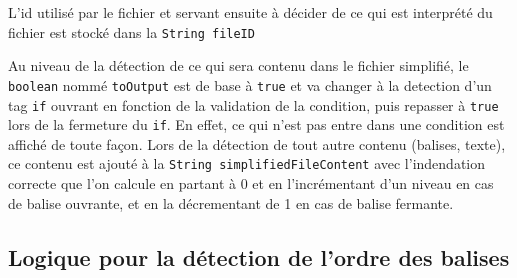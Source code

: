 \documentclass[a4paper]{article}
\begin{document}
L'id utilisé par le fichier et servant ensuite à décider de ce qui est interprété du fichier est stocké dans la \verb+String fileID+

Au niveau de la détection de ce qui sera contenu dans le fichier simplifié, le \verb+boolean+ nommé \verb+toOutput+ est de base à \verb+true+ et va changer à la detection d'un tag \verb+if+ ouvrant en fonction de la validation de la condition, puis repasser à \verb+true+ lors de la fermeture du \verb+if+. En effet, ce qui n'est pas entre dans une condition est affiché de toute façon. Lors de la détection de tout autre contenu (balises, texte), ce contenu est ajouté à la \verb+String simplifiedFileContent+ avec l'indendation correcte que l'on calcule en partant à 0 et en l'incrémentant d'un niveau en cas de balise ouvrante, et en la décrementant de 1 en cas de balise fermante.
\subsection{Logique pour la détection de l'ordre des balises}
\end{document}
